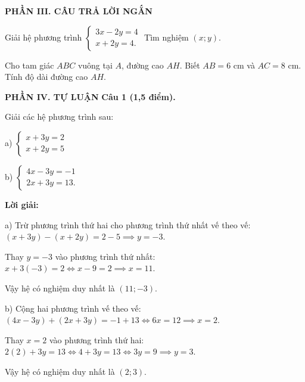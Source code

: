 \documentclass[12pt,a4paper]{article}
\begin{document}
\vspace{2mm}
\noindent\textbf{\large PHẦN III. CÂU TRẢ LỜI NGẮN}
\vspace{1mm}
\begin{ex}
Giải hệ phương trình $\begin{cases} 3x - 2y = 4 \\ x + 2y = 4. \end{cases}$ Tìm nghiệm $(x; y)$.
\end{ex}

\begin{ex}
Cho tam giác $ABC$ vuông tại $A$, đường cao $AH$. Biết $AB = 6\text{ cm}$ và $AC = 8\text{ cm}$. Tính độ dài đường cao $AH$.
\end{ex}


\newpage
\noindent\textbf{\large PHẦN IV. TỰ LUẬN}
\vspace{1mm}
\noindent\textbf{Câu 1 (1,5 điểm).}

Giải các hệ phương trình sau:\par a) $\begin{cases} x + 3y = 2 \\ x + 2y = 5 \end{cases}$\par b) $\begin{cases} 4x - 3y = -1 \\ 2x + 3y = 13. \end{cases}$

\noindent\textbf{Lời giải:}

a) Trừ phương trình thứ hai cho phương trình thứ nhất vế theo vế: $(x + 3y) - (x + 2y) = 2 - 5 \implies y = -3$.\par Thay $y = -3$ vào phương trình thứ nhất: $x + 3(-3) = 2 \iff x - 9 = 2 \implies x = 11$.\par Vậy hệ có nghiệm duy nhất là $(11; -3)$.\par b) Cộng hai phương trình vế theo vế: $(4x - 3y) + (2x + 3y) = -1 + 13 \iff 6x = 12 \implies x = 2$.\par Thay $x = 2$ vào phương trình thứ hai: $2(2) + 3y = 13 \iff 4 + 3y = 13 \iff 3y = 9 \implies y = 3$.\par Vậy hệ có nghiệm duy nhất là $(2; 3)$.
\end{document}
